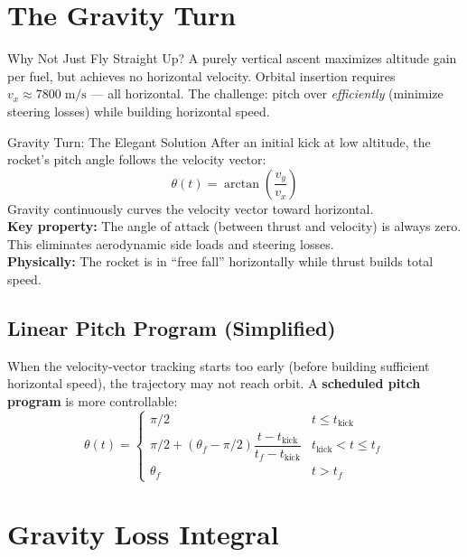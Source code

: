 \documentclass[12pt, a4paper]{article}
\begin{document}
\section{The Gravity Turn}

\begin{theorybox}{Why Not Just Fly Straight Up?}
A purely vertical ascent maximizes altitude gain per fuel, but achieves no horizontal velocity.
Orbital insertion requires $v_x \approx 7800\;\text{m/s}$ — all horizontal.
The challenge: pitch over \textit{efficiently} (minimize steering losses) while building horizontal speed.
\end{theorybox}

\begin{theorybox}{Gravity Turn: The Elegant Solution}
After an initial kick at low altitude, the rocket's pitch angle follows the velocity vector:
\[
  \theta(t) = \arctan\!\left(\frac{v_y}{v_x}\right)
\]
Gravity continuously curves the velocity vector toward horizontal.\\[0.4em]
\textbf{Key property:} The angle of attack (between thrust and velocity) is always zero.
This eliminates aerodynamic side loads and steering losses.\\[0.4em]
\textbf{Physically:} The rocket is in ``free fall'' horizontally while thrust builds total speed.
\end{theorybox}

\subsection*{Linear Pitch Program (Simplified)}

When the velocity-vector tracking starts too early (before building sufficient horizontal speed), the trajectory may not reach orbit. A \textbf{scheduled pitch program} is more controllable:
\[
  \theta(t) = \begin{cases}
    \pi/2 & t \leq t_\text{kick} \\
    \pi/2 + (\theta_f - \pi/2)\dfrac{t - t_\text{kick}}{t_f - t_\text{kick}} & t_\text{kick} < t \leq t_f \\
    \theta_f & t > t_f
  \end{cases}
\]

\section{Gravity Loss Integral}
\end{document}
